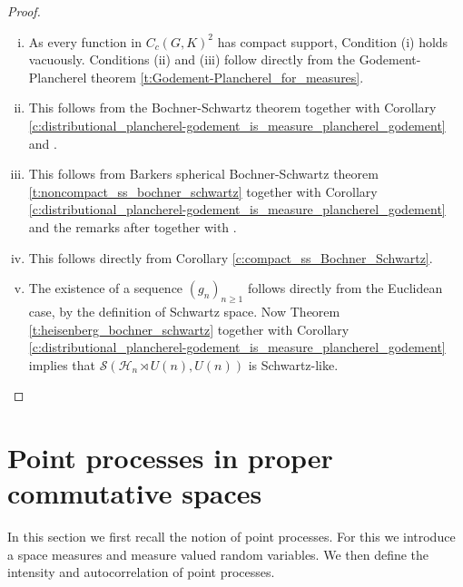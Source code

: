 \documentclass[12pt,reqno,a4paper]{amsart}
\theoremstyle{theorem}
\theoremstyle{definition}
\numberwithin{theorem}{section}
\numberwithin{equation}{section}
\begin{document}
\begin{proof}[Proof]
	\begin{enumerate}[(i)]
		\item As every function in $C_c(G, K)^2$ has compact support, Condition (i) holds vacuously. Conditions (ii) and (iii) follow directly from the Godement-Plancherel theorem \ref{t:Godement-Plancherel_for_measures}.
		\item This follows from the Bochner-Schwartz theorem together with Corollary \ref{c:distributional_plancherel-godement_is_measure_plancherel_godement} and \cite[Theorem 1.8.7]{GrafakosTextbook}.
		\item This follows from Barkers spherical Bochner-Schwartz theorem \ref{t:noncompact_ss_bochner_schwartz} together with Corollary \ref{c:distributional_plancherel-godement_is_measure_plancherel_godement} and the remarks after \cite[Definition 7.8.4]{VaradarajanGangolli} together with \cite[Lemma 6.1.7]{VaradarajanGangolli}.
		\item This follows directly from Corollary \ref{c:compact_ss_Bochner_Schwartz}.
		\item The existence of a sequence $(g_n)_{n\geq 1}$ follows directly from the Euclidean case, by the definition of Schwartz space. Now Theorem \ref{t:heisenberg_bochner_schwartz} together with Corollary \ref{c:distributional_plancherel-godement_is_measure_plancherel_godement} implies that $\mathscr{S}(\mathcal{H}_n\rtimes U(n), U(n))$ is Schwartz-like.\qedhere
	\end{enumerate}
\end{proof}

\section{Point processes in proper commutative spaces}\label{s:PointProcesses}
In this section we first recall the notion of point processes. For this we introduce a space measures and measure valued random variables. We then define the intensity and autocorrelation of point processes.
\end{document}
